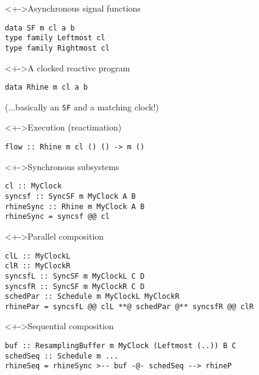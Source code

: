 \documentclass[handout]{enigtex-beamer-base}
\begin{document}
\begin{frame}[fragile]
\begin{block}<+->{Asynchronous signal functions}
\begin{verbatim}
data SF m cl a b
type family Leftmost cl
type family Rightmost cl
\end{verbatim}
\end{block}
\begin{block}<+->{A clocked reactive program}
\begin{verbatim}
data Rhine m cl a b
\end{verbatim}
(...basically an \texttt{SF} and a matching clock!)
\end{block}
\begin{block}<+->{Execution (reactimation)}
\begin{verbatim}
flow :: Rhine m cl () () -> m ()
\end{verbatim}
\end{block}
\end{frame}

\begin{frame}[fragile]
\begin{block}<+->{Synchronous subsystems}
\begin{verbatim}
cl :: MyClock
syncsf :: SyncSF m MyClock A B
rhineSync :: Rhine m MyClock A B
rhineSync = syncsf @@ cl
\end{verbatim}
\end{block}
\end{frame}

\begin{frame}[fragile]
\begin{block}<+->{Parallel composition}
\begin{verbatim}
clL :: MyClockL
clR :: MyClockR
syncsfL :: SyncSF m MyClockL C D
syncsfR :: SyncSF m MyClockR C D
schedPar :: Schedule m MyClockL MyClockR
rhinePar = syncsfL @@ clL **@ schedPar @** syncsfR @@ clR
\end{verbatim}
\end{block}
\begin{block}<+->{Sequential composition}
\begin{verbatim}
buf :: ResamplingBuffer m MyClock (Leftmost (..)) B C
schedSeq :: Schedule m ...
rhineSeq = rhineSync >-- buf -@- schedSeq --> rhineP
\end{verbatim}
\end{block}
\end{frame}
\end{document}
